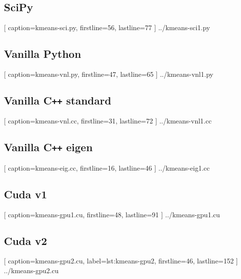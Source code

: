 \documentclass{article}
\begin{document}
  \subsection{\sc SciPy}
  
    [
      caption={\sf kmeans-sci.py},
      firstline=56,
      lastline=77
    ]
    {../kmeans-sci1.py}

  \subsection{\sc Vanilla Python}
  
    [
      caption={\sf kmeans-vnl.py},
      firstline=47,
      lastline=65
    ]
    {../kmeans-vnl1.py}

  \subsection{\sc Vanilla C{\tt++} standard}
  
    [
      caption={\sf kmeans-vnl.cc},
      firstline=31,
      lastline=72
    ]
    {../kmeans-vnl1.cc}

  \subsection{\sc Vanilla C{\tt++} eigen}
  
    [
      caption={\sf kmeans-eig.cc},
      firstline=16,
      lastline=46
    ]
    {../kmeans-eig1.cc}

  \subsection{\sc Cuda v1}
  
    [
      caption={\sf kmeans-gpu1.cu},
      firstline=48,
      lastline=91
    ]
    {../kmeans-gpu1.cu}

  \subsection{\sc Cuda v2}
  
    [
      caption={\sf kmeans-gpu2.cu},
      label={lst:kmeans-gpu2},
      firstline=46,
      lastline=152
    ]
    {../kmeans-gpu2.cu}
\end{document}
